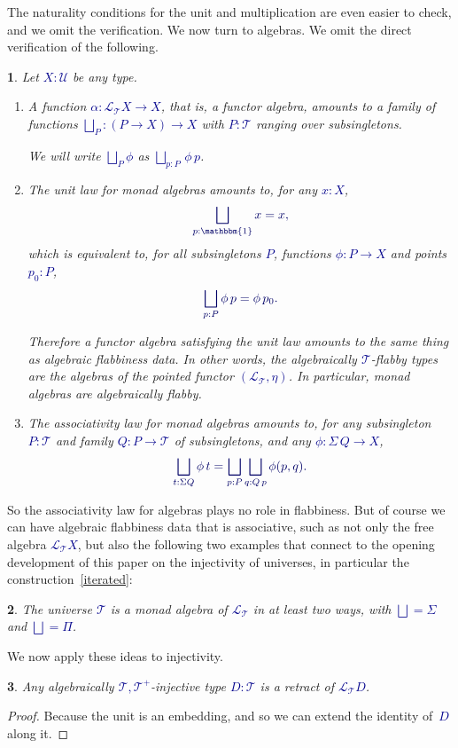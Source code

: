 \documentclass[10pt]{article}
\newcommand{\db}{\textcolor{darkblue}}
\newcommand{\m}[1]{\db{$#1$}}
\newcommand{\M}[1]{\[\db{#1}\]}
\newcommand{\U}{\mathcal{U}}
\newcommand{\T}{\mathcal{T}}
\newcommand{\Lift}{\mathcal{L}}
\newcommand{\One}{\mathbbm{1}}
\newtheorem{numbered}{}
\theoremstyle{definition}
\begin{document}
\noindent The naturality conditions for the unit and multiplication are
even easier to check, and we omit the verification. We now turn to
algebras. We omit the direct verification of the following.

\begin{numbered} Let \m{X:\U} be any type.
  \begin{enumerate}
  \item A function \m{\alpha : \Lift_\T X \to X}, that is, a functor
    algebra, amounts to a family of functions \m{\bigsqcup_P : (P \to
      X) \to X} with \m{P : \T} ranging over subsingletons.


    \medskip We will write \m{\bigsqcup_P \phi} as \m{\bigsqcup_{p : P} \, \phi \, p}.
  \item The unit law for monad algebras amounts to, for any \m{x:X},
    \M{
       \bigsqcup_{p : \One} x = x,
    }
    which is equivalent to, for all subsingletons \m{P}, functions \m{\phi : P \to X} and points \m{p_0 : P},
    \M{
       \bigsqcup_{p : P} \phi \, p = \phi \, p_0.
    }


    \medskip Therefore a functor algebra satisfying the unit law
    amounts to the same thing as algebraic flabbiness data. In other
    words, the algebraically \m{\T}-flabby types are the algebras of
    the pointed functor \m{(\Lift_\T,\eta)}. In particular,
    monad algebras are algebraically flabby.
  \item The associativity law for monad algebras amounts to, for any subsingleton \m{P :
      \T} and family \m{Q : P \to \T} of subsingletons, and any \m{\phi : \Sigma \, Q \to X},
    \M{
      \bigsqcup_{t : \Sigma Q} \phi \, t = \bigsqcup_{p : P} \bigsqcup_{q : Q \, p} \phi (p ,q).
    }
  \end{enumerate}
\end{numbered}
\noindent So the associativity law for algebras plays no role in
flabbiness. But of course we can have algebraic flabbiness data that
is associative, such as not only the free algebra \m{\Lift_\T X}, but
also the following two examples that connect to the opening
development of this paper on the injectivity of universes, in
particular the construction~\ref{iterated}:
\begin{numbered} The universe \m{\T} is a monad algebra of
  \m{\Lift_\T} in at least two ways, with \m{\bigsqcup = \Sigma} and
  \m{\bigsqcup = \Pi}.
\end{numbered}


We now apply these ideas to injectivity.
\begin{numbered}
  Any algebraically \m{\T,\T^+}-injective type \m{D:\T} is a retract of \m{\Lift_\T D}.
\end{numbered}
\begin{proof}
  Because the unit is an embedding, and so we can extend the identity of~\m{D} along it.
\end{proof}
\end{document}
